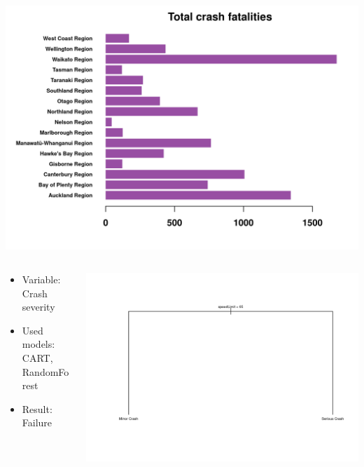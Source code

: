 \documentclass[xcolor=dvipsnames,xcolor=table, 14p]{beamer}
\begin{document}
\begin{frame}
    \centering
    \includegraphics[width=1\textwidth]{figures/regions2-1.png}
\end{frame}

\begin{frame}
    \begin{columns}
        \begin{column}{0.5\textwidth}
        \begin{itemize}
            \item Variable: Crash severity
            \item Used models: CART, RandomForest
            \item Result: Failure
        \end{itemize}
        \end{column}

        \begin{column}{0.5\textwidth}
            \centering
            \includegraphics[width=1\textwidth]{figures/cart-1.png}
        \end{column}
    \end{columns}
\end{frame}
\end{document}
